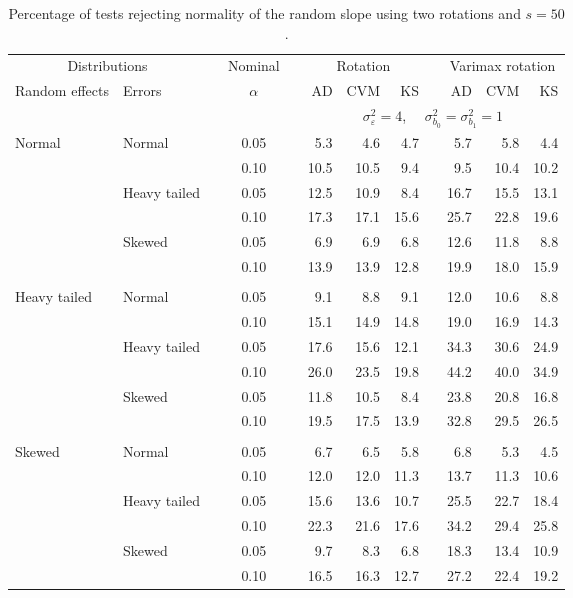 \begin{table}[ht]
\centering
\caption{\label{tab:fixedsimb150} Percentage of tests rejecting normality of the random slope using two rotations and $s = 50$.}
\begin{scriptsize}
\begin{tabular}{ll p{.1cm} c p{.1cm} rrr p{.1cm} rrr}
  \hline
  \multicolumn{2}{c}{Distributions}& & Nominal & &  \multicolumn{3}{c}{Rotation} & & \multicolumn{3}{c}{Varimax rotation} \\ \cline{1-2} \cline{6-8} \cline{10-12}   
  Random effects & Errors & & $\alpha$ & & AD & CVM & KS & & AD & CVM & KS \\ 
   \hline
& && && \multicolumn{7}{c}{$\sigma_{\varepsilon}^2 = 4$, \ \ $\sigma_{b_0}^2 = \sigma_{b_1}^2 = 1$} \\ \cline{6-12}
\rowcolor{gray!20} Normal & Normal &  & 0.05 &  & 5.3 & 4.6 & 4.7 &  & 5.7 & 5.8 & 4.4 \\ 
\rowcolor{gray!20}    &  &  & 0.10 &  & 10.5 & 10.5 & 9.4 &  & 9.5 & 10.4 & 10.2 \\ 
\rowcolor{gray!20}    & Heavy tailed &  & 0.05 &  & 12.5 & 10.9 & 8.4 &  & 16.7 & 15.5 & 13.1 \\ 
\rowcolor{gray!20}    &  &  & 0.10 &  & 17.3 & 17.1 & 15.6 &  & 25.7 & 22.8 & 19.6 \\ 
\rowcolor{gray!20}    & Skewed &  & 0.05 &  & 6.9 & 6.9 & 6.8 &  & 12.6 & 11.8 & 8.8 \\ 
\rowcolor{gray!20}    &  &  & 0.10 &  & 13.9 & 13.9 & 12.8 &  & 19.9 & 18.0 & 15.9 \\ 
&&&&&&&&&&&\\
  Heavy tailed & Normal &  & 0.05 &  & 9.1 & 8.8 & 9.1 &  & 12.0 & 10.6 & 8.8 \\ 
   &  &  & 0.10 &  & 15.1 & 14.9 & 14.8 &  & 19.0 & 16.9 & 14.3 \\ 
   & Heavy tailed &  & 0.05 &  & 17.6 & 15.6 & 12.1 &  & 34.3 & 30.6 & 24.9 \\ 
   &  &  & 0.10 &  & 26.0 & 23.5 & 19.8 &  & 44.2 & 40.0 & 34.9 \\ 
   & Skewed &  & 0.05 &  & 11.8 & 10.5 & 8.4 &  & 23.8 & 20.8 & 16.8 \\ 
   &  &  & 0.10 &  & 19.5 & 17.5 & 13.9 &  & 32.8 & 29.5 & 26.5 \\ 
&&&&&&&&&&&\\
  Skewed & Normal &  & 0.05 &  & 6.7 & 6.5 & 5.8 &  & 6.8 & 5.3 & 4.5 \\ 
   &  &  & 0.10 &  & 12.0 & 12.0 & 11.3 &  & 13.7 & 11.3 & 10.6 \\ 
   & Heavy tailed &  & 0.05 &  & 15.6 & 13.6 & 10.7 &  & 25.5 & 22.7 & 18.4 \\ 
   &  &  & 0.10 &  & 22.3 & 21.6 & 17.6 &  & 34.2 & 29.4 & 25.8 \\ 
   & Skewed &  & 0.05 &  & 9.7 & 8.3 & 6.8 &  & 18.3 & 13.4 & 10.9 \\ 
   &  &  & 0.10 &  & 16.5 & 16.3 & 12.7 &  & 27.2 & 22.4 & 19.2 \\ 


\end{tabular}
\end{scriptsize}
\end{table}
